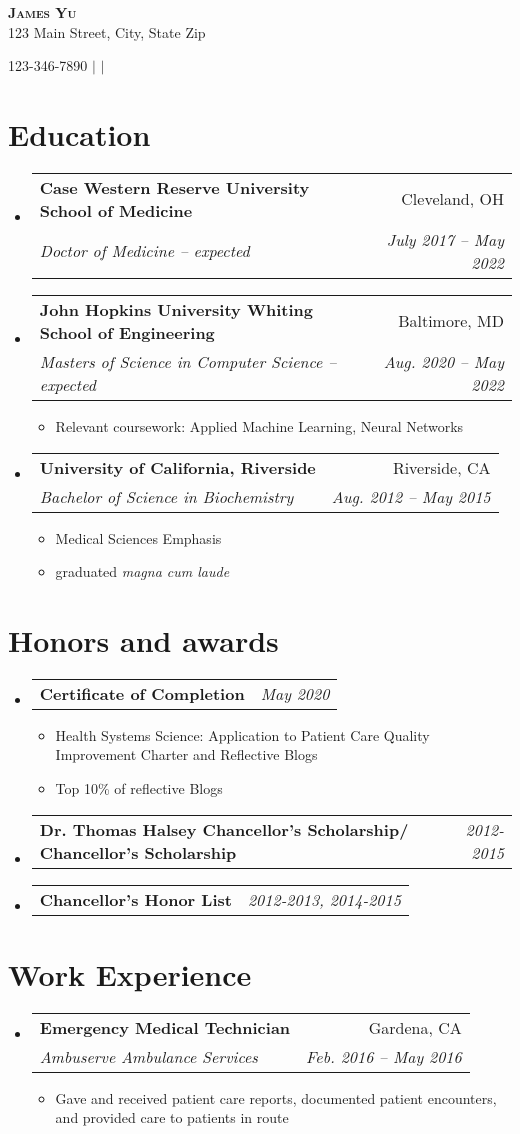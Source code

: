 \documentclass[letterpaper,11pt]{article}
\makeatletter
\newcommand{\cvSubheading}[4]{
  \vspace{-2pt}\item
    \begin{tabular*}{0.97\textwidth}[t]{l@{\extracolsep{\fill}}r}
      \textbf{#1} & #2 \\
      \textit{\small#3} & \textit{\small #4} \\
    \end{tabular*}\vspace{-7pt}
}
\newcommand{\cvSingleSubheading}[2]{
    \item
    \begin{tabular*}{0.97\textwidth}{l@{\extracolsep{\fill}}r}
      \textbf{#1} & \textit{\small #2} \\
    \end{tabular*}\vspace{-7pt}
}
\newcommand{\cvItem}[1]{
  \item\small{
    {#1 \vspace{-2pt}}
  }
}
\newcommand{\cvSubHeadingListStart}{\begin{itemize}[leftmargin=0.15in, label={}]}
\newcommand{\cvSubHeadingListEnd}{\end{itemize}}
\newcommand{\cvItemListStart}{\begin{itemize}}
\newcommand{\cvItemListEnd}{\vspace{-5pt}\end{itemize}}
\makeatother
\begin{document}
\begin{center}
    \textbf{\Huge \scshape James Yu} \\ \vspace{1pt}
    123 Main Street, City, State Zip

    \small 123-346-7890 
    $|$ \href{mailto:john.doe@x.edu}{\underline{}} 
    $|$ \href{linkedin.com/in/james-yu-b8883491/}{\underline{}} 
    \vspace{-15pt}
\end{center}

\section{Education}
  \cvSubHeadingListStart
    \cvSubheading
      {Case Western Reserve University School of Medicine}{Cleveland, OH}
      {Doctor of Medicine -- expected}{July 2017 -- May 2022}
    \cvSubheading
      {John Hopkins University Whiting School of Engineering}{Baltimore, MD}
      {Masters of Science in Computer Science -- expected}{Aug. 2020 -- May 2022}
    \cvItemListStart
        \cvItem{Relevant coursework: Applied Machine Learning, Neural Networks}
    \cvItemListEnd
    \cvSubheading
      {University of California, Riverside}{Riverside, CA}
      {Bachelor of Science in Biochemistry}{Aug. 2012 -- May 2015}
      \cvItemListStart
        \cvItem{Medical Sciences Emphasis}
        \cvItem{graduated \textit{magna cum laude}}
    \cvItemListEnd
  \cvSubHeadingListEnd


\section{Honors and awards}
\cvSubHeadingListStart
    \cvSingleSubheading
      {\textbf{Certificate of Completion}} {May 2020}{}{}
        \cvItemListStart
            \cvItem{Health Systems Science: Application to Patient Care Quality Improvement Charter and Reflective Blogs}
            \cvItem{Top 10\% of reflective Blogs}
        \cvItemListEnd
    \cvSingleSubheading
      {\textbf{Dr. Thomas Halsey Chancellor’s Scholarship/ Chancellor’s Scholarship}}{2012-2015}{}{}
    \cvSingleSubheading
      {\textbf{Chancellor’s Honor List}}{2012-2013, 2014-2015}{}{}
\cvSubHeadingListEnd

\section{Work Experience}
  \cvSubHeadingListStart
    \cvSubheading
      {Emergency Medical Technician}{Gardena, CA}
      {Ambuserve Ambulance Services}{Feb. 2016 -- May 2016}
      \cvItemListStart
        \cvItem{Gave and received patient care reports, documented patient encounters, and provided care to patients in route}
      \cvItemListEnd
  \cvSubHeadingListEnd
\end{document}
